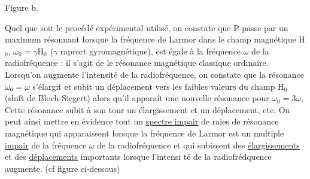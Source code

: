 \hfill
\begin{minipage}[c]{.3\linewidth}
\begin{center} 

Figure b.
\end{center}
\end{minipage}

Quel que soit le procédé expérimental utilisé, on constate que P
passe par un maximum résonnant lorsque la fréquence de Larmor dans le champ
magnétique H$_0$, $\omega_0=\gamma$H$_0$ ($\gamma$ raprort gyromagnétique), est égale à la fréquence
$\omega$ de la radiofréquence : il s'agit de le résonance magnétique classique ordinaire. 
Lorsqu'on augmente l'intensité de la radiofréquence, on constate que
la résonance $\omega_0=\omega$ s'élargit et subit un déplacement vers les faibles valeurs du champ H$_0$
(shift de Bloch-Siegert) alors qu'il apparaît une nouvelle
résonance pour $\omega_0=3\omega$, Cette résonance subit à son tour un élargissement et
un déplacement, etc, On peut ainsi mettre en évidence tout un \ul{spectre impair}
de raies de résonance magnétique qui apparaissent lorsque la fréquence de
Larmor est un multiple \ul{impair} de la fréquence $\omega$ de la radiofréquence et qui
subissent des \ul{élargissements} et des \ul{déplacements} importants lorsque l'intensi
té de la radiofrédquence augmente. (cf figure ci-dessous)
